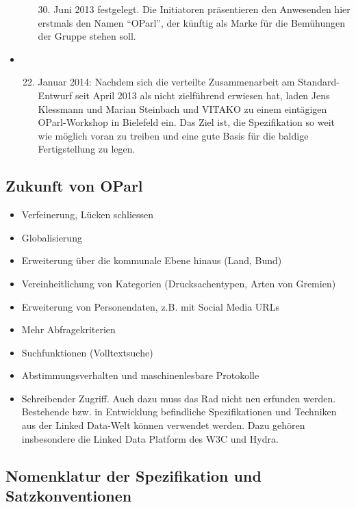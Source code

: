 \documentclass[,a4paper]{article}
\begin{document}
\begin{itemize}
\begin{enumerate}[1.]
    30. Juni 2013 festgelegt. Die Initiatoren präsentieren den
    Anwesenden hier erstmals den Namen ``OParl'', der künftig als Marke
    für die Bemühungen der Gruppe stehen soll.
  \end{enumerate}
\item
  \begin{enumerate}[1.]
  \setcounter{enumi}{21}
  \item
    Januar 2014: Nachdem sich die verteilte Zusammenarbeit am
    Standard-Entwurf seit April 2013 als nicht zielführend erwiesen hat,
    laden Jens Klessmann und Marian Steinbach und VITAKO zu einem
    eintägigen OParl-Workshop in Bielefeld ein. Das Ziel ist, die
    Spezifikation so weit wie möglich voran zu treiben und eine gute
    Basis für die baldige Fertigstellung zu legen.
  \end{enumerate}
\end{itemize}

\subsection{Zukunft von OParl}

\begin{itemize}
\item
  Verfeinerung, Lücken schliessen
\item
  Globalisierung
\item
  Erweiterung über die kommunale Ebene hinaus (Land, Bund)
\item
  Vereinheitlichung von Kategorien (Drucksachentypen, Arten von Gremien)
\item
  Erweiterung von Personendaten, z.B. mit Social Media URLs
\item
  Mehr Abfragekriterien
\item
  Suchfunktionen (Volltextsuche)
\item
  Abstimmungsverhalten und maschinenlesbare Protokolle
\item
  Schreibender Zugriff. Auch dazu muss das Rad nicht neu erfunden
  werden. Bestehende bzw. in Entwicklung befindliche Spezifikationen und
  Techniken aus der Linked Data-Welt können verwendet werden. Dazu
  gehören insbesondere die Linked Data Platform des W3C und Hydra.
\end{itemize}

\subsection{Nomenklatur der Spezifikation und Satzkonventionen}
\end{document}
